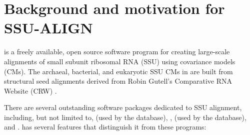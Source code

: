 \section{Background and motivation for SSU-ALIGN}

 is a freely available, open source software program
for creating large-scale alignments of small subunit ribosomal RNA
(SSU) using covariance models (CMs). The archaeal, bacterial,
and eukaryotic SSU CMs in  are built from structural
seed alignments derived from Robin Gutell's Comparative RNA Website
(CRW) \cite{CannoneGutell02}. 

There are several outstanding software packages dedicated to SSU
alignment, including, but not limited to,  (used by the
 database), , 
(used by the  database), and . 
 has several features that distinguish it from these
programs: 

